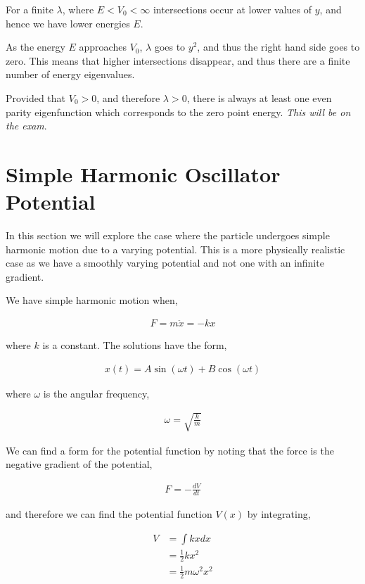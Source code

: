 \documentclass[11pt]{amsart}
\begin{document}
For a finite $\lambda$, where $E < V_0 < \infty$ intersections occur at lower values of $y$, and hence we have lower energies $E$.

As the energy $E$ approaches $V_0$, $\lambda$ goes to $y^2$, and thus the right hand side goes to zero. This means that higher intersections disappear, and thus there are a finite number of energy eigenvalues.

Provided that $V_0 > 0$, and therefore $\lambda > 0$, there is always at least one even parity eigenfunction which corresponds to the zero point energy. \textit{This will be on the exam}.

\section{Simple Harmonic Oscillator Potential}

In this section we will explore the case where the particle undergoes simple harmonic motion due to a varying potential. This is a more physically realistic case as we have a smoothly varying potential and not one with an infinite gradient.

We have simple harmonic motion when,

\begin{align*}
  F = m\ddot{x} = -kx
\end{align*}

where $k$ is a constant. The solutions have the form,

\begin{align*}
  x(t) = A\sin(\omega t) + B\cos(\omega t)
\end{align*}

where $\omega$ is the angular frequency,

\begin{align*}
  \omega = \sqrt{\frac{k}{m}}
\end{align*}

We can find a form for the potential function by noting that the force is the negative gradient of the potential,

\begin{align*}
  F = -\frac{dV}{dt}
\end{align*}

and therefore we can find the potential function $V(x)$ by integrating,

\begin{align*}
  V &= \int kx dx \\
    &= \frac{1}{2} kx^2 \\
    &= \frac{1}{2} m\omega^2 x^2
\end{align*}
\end{document}
